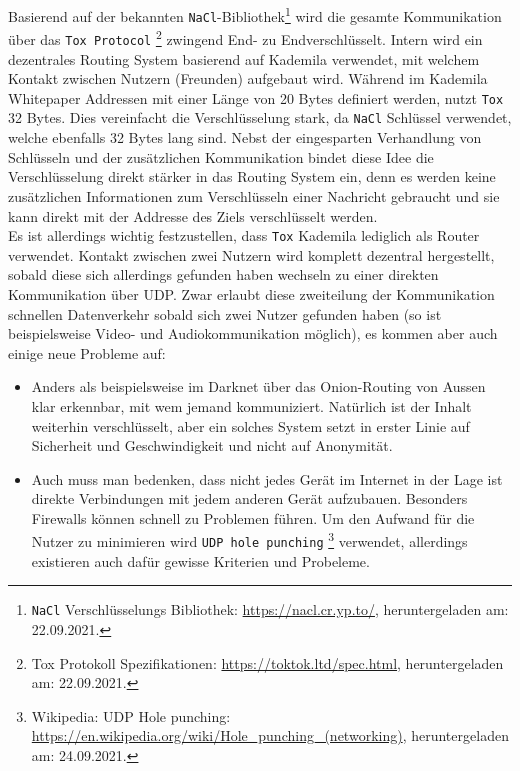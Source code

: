 \documentclass[11pt]{article}
\begin{document}
\noindent Basierend auf der bekannten \texttt{NaCl}-Bibliothek\footnote{\texttt{NaCl} Verschlüsselungs Bibliothek:
\url{https://nacl.cr.yp.to/}, heruntergeladen am: 22.09.2021.} wird die
gesamte Kommunikation über das \texttt{Tox Protocol} \footnote{Tox Protokoll Spezifikationen:  
\url{https://toktok.ltd/spec.html}, heruntergeladen am: 22.09.2021.} zwingend End- zu
Endverschlüsselt. Intern wird ein dezentrales Routing System basierend
auf Kademila verwendet, mit welchem Kontakt zwischen Nutzern
(Freunden) aufgebaut wird. Während im Kademila Whitepaper Addressen
mit einer Länge von 20 Bytes definiert werden, nutzt \texttt{Tox} 32 Bytes.
Dies vereinfacht die Verschlüsselung stark, da \texttt{NaCl} Schlüssel
verwendet, welche ebenfalls 32 Bytes lang sind. Nebst der eingesparten
Verhandlung von Schlüsseln und der zusätzlichen Kommunikation bindet
diese Idee die Verschlüsselung direkt stärker in das Routing System
ein, denn es werden keine zusätzlichen Informationen zum Verschlüsseln
einer Nachricht gebraucht und sie kann direkt mit der Addresse des
Ziels verschlüsselt werden.\\

\noindent Es ist allerdings wichtig festzustellen, dass \texttt{Tox} Kademila
lediglich als Router verwendet. Kontakt zwischen zwei Nutzern wird
komplett dezentral hergestellt, sobald diese sich allerdings gefunden
haben wechseln zu einer direkten Kommunikation über UDP. Zwar erlaubt
diese zweiteilung der Kommunikation schnellen Datenverkehr sobald sich
zwei Nutzer gefunden haben (so ist beispielsweise Video- und
Audiokommunikation möglich), es kommen aber auch einige neue Probleme
auf:
\begin{itemize}
\item Anders als beispielsweise im Darknet über das Onion-Routing von
Aussen klar erkennbar, mit wem jemand kommuniziert. Natürlich ist
der Inhalt weiterhin verschlüsselt, aber ein solches System setzt in
erster Linie auf Sicherheit und Geschwindigkeit und nicht auf
Anonymität.
\item Auch muss man bedenken, dass nicht jedes Gerät im Internet in der
Lage ist direkte Verbindungen mit jedem anderen Gerät aufzubauen.
Besonders Firewalls können schnell zu Problemen führen. Um den
Aufwand für die Nutzer zu minimieren wird \texttt{UDP hole punching} \footnote{Wikipedia: UDP Hole punching:  
\url{https://en.wikipedia.org/wiki/Hole\_punching\_(networking)},
heruntergeladen am: 24.09.2021.}
verwendet, allerdings existieren auch dafür gewisse Kriterien und
Probeleme.
\end{itemize}
\end{document}

